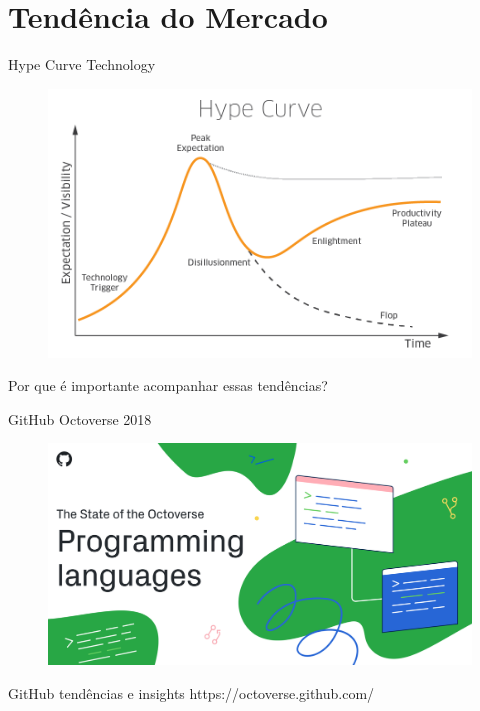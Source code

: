 \section{Tendência do Mercado}

\begin{frame}[fragile]{Hype Curve Technology}
\begin{figure}[ht!]
  \centering
  \includegraphics[scale=0.29]{images/hype_curve.png}
\end{figure}
\begin{center}
\small{Por que é importante acompanhar essas tendências?}
\end{center}
\end{frame}

\begin{frame}[fragile]{GitHub Octoverse 2018}
\begin{figure}[ht!]
  \centering
  \includegraphics[scale=0.3]{images/octoverse.png}
\end{figure}
\begin{center}
\small{GitHub tendências e insights}
\small{https://octoverse.github.com/}
\end{center}
\end{frame}

